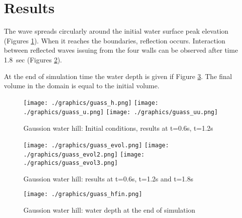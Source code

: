 \section{Results}
%

 The wave spreads circularly around the initial water surface peak elevation (Figures \ref{fig:gouttedo_evol}). When it reaches the boundaries, reflection occurs. Interaction between reflected waves issuing from the four walls can be observed after time 1.8~sec (Figures \ref{fig:gouttedo_evol2}). 

At the end of simulation time the water depth is given if Figure \ref{fig:gouttedo_end}. The final volume in the domain is equal to the initial volume.
\begin{figure}
  \texttt{[image: ./graphics/guass\_h.png]}
  \texttt{[image: ./graphics/guass\_u.png]}
  \texttt{[image: ./graphics/guass\_uu.png]}
\caption{Gaussion water hill: Initial conditions, results at t=0.6s, t=1.2s} \label{fig:gouttedo_evol}
\end{figure}

\begin{figure}
  \texttt{[image: ./graphics/guass\_evol.png]}
  \texttt{[image: ./graphics/guass\_evol2.png]}
  \texttt{[image: ./graphics/guass\_evol3.png]}
\caption{Gaussion water hill:  results at t=0.6s, t=1.2s and t=1.8s} \label{fig:gouttedo_evol2}
\end{figure}


\begin{figure}
  \texttt{[image: ./graphics/guass\_hfin.png]}
\caption{Gaussion water hill: water depth at the end of simulation} \label{fig:gouttedo_end}
\end{figure}

%
%
%

